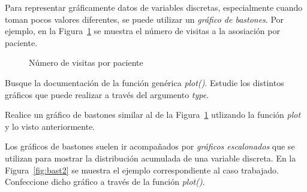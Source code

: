 \documentclass{prob}
\begin{document}
\newpage
	\begin{problema}
	Para representar gráficamente datos de variables discretas, especialmente cuando toman pocos valores diferentes, se puede utilizar un \textit{gráfico de bastones}. Por ejemplo, en la Figura~\ref{fig:bast} se muestra el número de visitas a la asosiación por paciente. 

\begin{figure}[!ht]
    \centering
    
    \caption{Número de visitas por paciente}
    \label{fig:bast}
\end{figure}		
	
	\begin{parte}
	Busque la documentación de la función genérica \textit{plot()}. Estudie los distintos gráficos que puede realizar a través del argumento \textit{type}.
	\end{parte}
	
	\begin{parte}
	Realice un gráfico de bastones similar al de la Figura~\ref{fig:bast} utlizando la función \textit{plot} y lo visto anteriormente. 
	\end{parte}

	\begin{parte}
	Los gráficos de bastones suelen ir acompañados por  \textit{gráficos escalonados} que se utilizan para mostrar la distribución acumulada de una variable discreta. En la Figura~\ref{fig:bast2} se muestra el ejemplo correspondiente al caso trabajado. Confeccione dicho gráfico a través de la función \textit{plot()}.\\
	
	\noindent{}
	\end{parte}


\end{problema}
\end{document}
